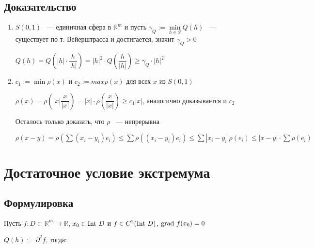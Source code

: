 \documentclass{article}
\begin{document}
        \subsection{Доказательство}
        
            \begin{enumerate}
            
                \item $S(0, 1)$ ~--- единичная сфера в $\mathbb{R}^m$ и пусть $\gamma_Q := \min\limits_{h \in S} Q(h)$ ~--- существует по т. Вейерштрасса и достигается, значит $\gamma_Q > 0$
                
                    $Q(h) = Q \left( |h| \cdot \dfrac{h}{|h|} \right) = |h|^2 \cdot Q \left( \dfrac{h}{|h|} \right) \geq \gamma_Q \cdot |h|^2$
                    
                \item $c_1 := \min \rho(x)$ и $c_2 := max \rho(x)$ для всех $x$ из $S(0, 1)$
                
                    $\rho(x) = \rho \left( |x| \dfrac{x}{|x|} \right) = |x| \cdot \rho \left( \dfrac{x}{|x|} \right) \geq c_1 |x|$, аналогично доказывается и $c_2$
                    
                    Осталось только доказать, что $\rho$ ~--- непрерывна
                    
                    $\rho(x - y) = \rho(\sum (x_i - y_i) e_i) \leq \sum \rho((x_i - y_i)e_i) \leq \sum |x_i - y_i| \rho(e_i) \leq |x - y| \cdot \sum \rho(e_i)$
                    
            \end{enumerate}
            
    \newpage
    
    \section{Достаточное условие экстремума}
    
        \subsection{Формулировка}
        
            Пусть $f : D \subset \mathbb{R}^m \rightarrow \mathbb{R}$, $x_0 \in \Int D$ и $f \in C^2 ( \Int D )$, $\grad f(x_0) = 0$
            
            $Q(h) := \partial^2f$, тогда:
            
\end{document}
